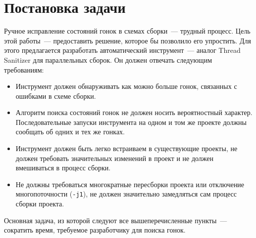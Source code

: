 \section{Постановка задачи}
\label{sec:Chapter1} 


Ручное исправление состояний гонок в схемах сборки~--- трудный процесс. Цель этой работы~--- предоставить решение, которое бы позволило его упростить. Для этого предлагается разработать автоматический инструмент~--- аналог Thread Sanitizer \cite{35604} для параллельных сборок. Он должен отвечать следующим требованиям:

\begin{itemize}
	\item Инструмент должен обнаруживать как можно больше гонок, связанных с ошибками в схеме сборки.
	\item Алгоритм поиска состояний гонок не должен носить вероятностный характер. Последовательные запуски инструмента на одном и том же проекте должны сообщать об одних и тех же гонках. 
	\item Инструмент должен быть легко встраиваем в существующие проекты, не должен требовать значительных изменений в проект и не должен вмешиваться в процесс сборки. 
	\item Не должны требоваться многократные пересборки проекта или отключение многопоточности (\texttt{-j1}), не должен значительно замедляться сам процесс сборки проекта.
\end{itemize}

Основная задача, из которой следуют все вышеперечисленные пункты~--- сократить время, требуемое разработчику для поиска гонок.